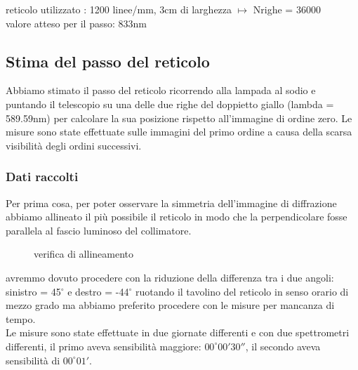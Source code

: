 \documentclass[a4paper]{article}
\theoremstyle{definition}
\begin{document}
\noindent reticolo utilizzato : 1200 linee/mm, 3cm di larghezza  $\mapsto$ Nrighe = 36000\\
valore atteso per il passo: 833nm
\subsection{Stima del passo del reticolo}
Abbiamo stimato il passo del reticolo ricorrendo alla lampada al sodio e puntando il telescopio su una delle due righe del doppietto giallo (lambda = 589.59nm) per calcolare la sua posizione rispetto all'immagine di ordine zero.
Le misure sono state effettuate sulle immagini del primo ordine a causa della scarsa visibilità degli ordini successivi.

\subsubsection{Dati raccolti}
Per prima cosa, per poter osservare la simmetria dell'immagine di diffrazione abbiamo allineato il più possibile il reticolo in modo che la perpendicolare fosse parallela al fascio luminoso del collimatore.\\

\begin{figure}[!htbp]
\captionsetup{labelformat=empty}
    	\caption{verifica di allineamento}
    \end{figure}
\noindent avremmo dovuto procedere con la riduzione della differenza tra i due angoli: sinistro = 45$^{\circ}$ e destro = -44$^{\circ}$ ruotando il tavolino del reticolo in senso orario di mezzo grado ma abbiamo preferito procedere con le misure per mancanza di tempo.\\
Le misure sono state effettuate in due giornate differenti e con due spettrometri differenti, il primo aveva sensibilità maggiore: \(00 ^{\circ} 00' 30''\), il secondo aveva sensibilità di \(00^{\circ} 01'\).
\end{document}
